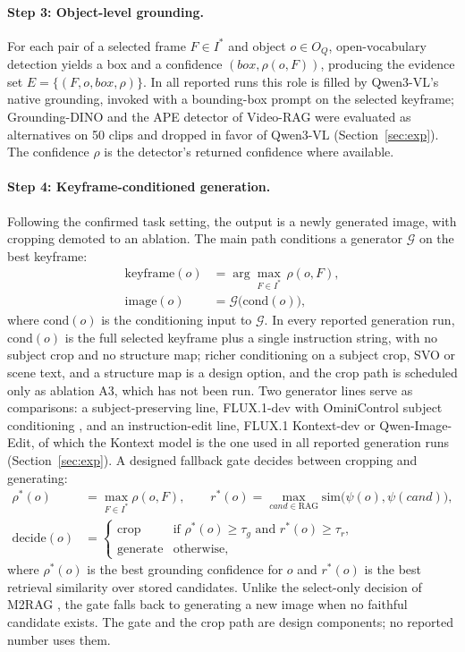 \paragraph{Step 3: Object-level grounding.} For each pair of a selected frame $F \in I^*$ and object $o \in O_Q$, open-vocabulary detection yields a box and a confidence $(box, \rho(o,F))$, producing the evidence set $E = \{(F, o, box, \rho)\}$. In all reported runs this role is filled by Qwen3-VL's native grounding, invoked with a bounding-box prompt on the selected keyframe; Grounding-DINO and the APE detector of Video-RAG \citep{videorag2411} were evaluated as alternatives on 50 clips and dropped in favor of Qwen3-VL (Section~\ref{sec:exp}). The confidence $\rho$ is the detector's returned confidence where available.

\paragraph{Step 4: Keyframe-conditioned generation.} Following the confirmed task setting, the output is a newly generated image, with cropping demoted to an ablation. The main path conditions a generator $\mathcal{G}$ on the best keyframe:
\begin{align}
\mathrm{keyframe}(o) &= \arg\max_{F \in I^*}\, \rho(o,F), \\
\mathrm{image}(o) &= \mathcal{G}\big(\mathrm{cond}(o)\big),
\end{align}
where $\mathrm{cond}(o)$ is the conditioning input to $\mathcal{G}$. In every reported generation run, $\mathrm{cond}(o)$ is the full selected keyframe plus a single instruction string, with no subject crop and no structure map; richer conditioning on a subject crop, SVO or scene text, and a structure map is a design option, and the crop path is scheduled only as ablation A3, which has not been run. Two generator lines serve as comparisons: a subject-preserving line, FLUX.1-dev with OminiControl subject conditioning \citep{ominicontrol2411}, and an instruction-edit line, FLUX.1 Kontext-dev or Qwen-Image-Edit, of which the Kontext model is the one used in all reported generation runs (Section~\ref{sec:exp}). A designed fallback gate decides between cropping and generating:
\begin{align}
\rho^*(o) &= \max_{F \in I^*} \rho(o,F), \qquad r^*(o) = \max_{cand \in \mathrm{RAG}} \mathrm{sim}\big(\psi(o), \psi(cand)\big), \\
\mathrm{decide}(o) &= \begin{cases} \text{crop} & \text{if } \rho^*(o) \ge \tau_g \text{ and } r^*(o) \ge \tau_r, \\ \text{generate} & \text{otherwise}, \end{cases}
\end{align}
where $\rho^*(o)$ is the best grounding confidence for $o$ and $r^*(o)$ is the best retrieval similarity over stored candidates. Unlike the select-only decision of M2RAG \citep{m2rag2411}, the gate falls back to generating a new image when no faithful candidate exists. The gate and the crop path are design components; no reported number uses them.

